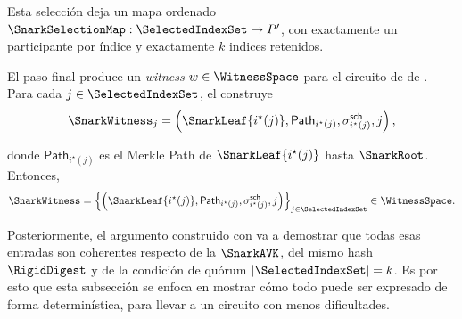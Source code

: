 Esta selección deja un mapa ordenado $\SnarkSelectionMap : \SelectedIndexSet \to P'$, con exactamente un participante por índice y exactamente $k$ indices retenidos.

El paso final produce un \textit{witness} $w \in \WitnessSpace$ para el circuito de \HaloTwo de \Mithril. Para cada $j \in \SelectedIndexSet$, el \MithrilAggregator construye
$$\SnarkWitness_j = \left(\SnarkLeaf{i^{\star}(j)}, \mathsf{Path}_{i^{\star}(j)}, \sigma^{\mathsf{sch}}_{i^{\star}(j)}, j\right),$$

donde $\mathsf{Path}_{i^{\star}(j)}$ es el Merkle Path de $\SnarkLeaf{i^{\star}(j)}$ hasta $\SnarkRoot$. Entonces,
$$\SnarkWitness =
\left\{\left(\SnarkLeaf{i^{\star}(j)}, \mathsf{Path}_{i^{\star}(j)}, \sigma^{\mathsf{sch}}_{i^{\star}(j)}, j\right)\right\}_{j \in \SelectedIndexSet} \in \WitnessSpace.$$

Posteriormente, el argumento construido con \HaloTwo va a demostrar que todas esas entradas son coherentes respecto de la $\SnarkAVK$, del mismo hash $\RigidDigest$ y de la condición de quórum $|\SelectedIndexSet| = k$. Es por esto que esta subsección se enfoca en mostrar cómo todo puede ser expresado de forma determinística, para llevar a un circuito con menos dificultades.
